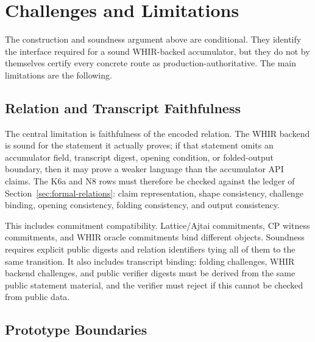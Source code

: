 \documentclass[11pt]{article}
\theoremstyle{definition}
\begin{document}
\section{Challenges and Limitations}
\label{sec:challenges-limitations}

The construction and soundness argument above are conditional. They identify the
interface required for a sound WHIR-backed accumulator, but they do not by
themselves certify every concrete route as production-authoritative. The main
limitations are the following.

\subsection{Relation and Transcript Faithfulness}
\label{sec:relation-encoding-limitations}

The central limitation is faithfulness of the encoded relation. The WHIR backend
is sound for the statement it actually proves; if that statement omits an
accumulator field, transcript digest, opening condition, or folded-output
boundary, then it may prove a weaker language than the accumulator API claims.
The K6a and N8 rows must therefore be checked against the ledger of
Section~\ref{sec:formal-relations}: claim representation, shape consistency,
challenge binding, opening consistency, folding consistency, and output
consistency.

This includes commitment compatibility. Lattice/Ajtai commitments, CP witness
commitments, and WHIR oracle commitments bind different objects. Soundness
requires explicit public digests and relation identifiers tying all of them to
the same transition. It also includes transcript binding: folding challenges,
WHIR backend challenges, and public verifier digests must be derived from the
same public statement material, and the verifier must reject if this cannot be
checked from public data.

\subsection{Prototype Boundaries}
\label{sec:prototype-boundaries}
\end{document}
